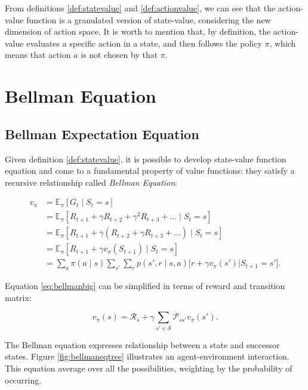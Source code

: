 From definitions \ref{def:statevalue} and \ref{def:actionvalue}, we can see that the action-value function is a granulated version of state-value, considering the new dimension of action space. It is worth to mention that, by definition, the action-value evaluates a specific action in a state, and then follows the policy $\pi$, which means that action $a$ is not chosen by that $\pi$. 

\section{Bellman Equation}

\subsection{Bellman Expectation Equation}

Given definition \ref{def:statevalue}, it is possible to develop state-value function equation and come to a fundamental property of value functions: they satisfy a recursive relationship called \textit{Bellman Equation}:

\begin{align}
v_{\pi} &= \mathbb{E}_{\pi}[G_{t} \mid S_{t} = s] \\
&= \mathbb{E}_{\pi}[R_{t+1} + \gamma R_{t+2} + \gamma^{2} R_{t+3} + \dots \mid S_{t} = s] \\
&= \mathbb{E}_{\pi}[R_{t+1} + \gamma (R_{t+2} + \gamma R_{t+3} + \dots) \mid S_{t} = s] \\
&= \mathbb{E}_{\pi}[R_{t+1} + \gamma v_{\pi}(S_{t+1}) \mid S_{t} = s] \\
&= \sum_{a}\pi(a \mid s) \sum_{s'}\sum_{r} p(s', r \mid s, a) \Bigg[ r + \gamma v_{\pi}(s') \Bigg| S_{t+1} = s'\Bigg].
\label{eq:bellmanbig}
\end{align}

Equation \ref{eq:bellmanbig} can be simplified in terms of reward and transition matrix:

\begin{equation}
v_{\pi}(s) = \mathcal{R}_{s} + \gamma \sum_{s' \in \mathcal{S}}\mathcal{P}_{ss'}v_{\pi}(s').
\label{eq:bellmanfinal}
\end{equation}

The Bellman equation expresses relationship between a state and successor states. Figure \ref{fig:bellmaneqtree} illustrates an agent-environment interaction. This equation average over all the possibilities, weighting by the probability of occurring.

